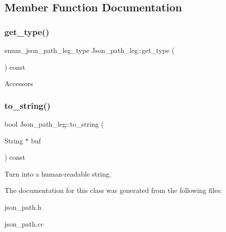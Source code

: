 \subsection{Member Function Documentation}
\mbox{\label{classJson__path__leg_ac4bdd7d72774340b7033a907cab8559c}} 
\subsubsection{\texorpdfstring{get\+\_\+type()}{get\_type()}}
{\footnotesize\ttfamily enum\+\_\+json\+\_\+path\+\_\+leg\+\_\+type Json\+\_\+path\+\_\+leg\+::get\+\_\+type (\begin{DoxyParamCaption}{ }\end{DoxyParamCaption}) const}

Accessors \mbox{\label{classJson__path__leg_ad9bf500a1518502e2f536782ce543ef4}} 
\subsubsection{\texorpdfstring{to\+\_\+string()}{to\_string()}}
{\footnotesize\ttfamily bool Json\+\_\+path\+\_\+leg\+::to\+\_\+string (\begin{DoxyParamCaption}\item[{String $\ast$}]{buf }\end{DoxyParamCaption}) const}

Turn into a human-\/readable string. 

The documentation for this class was generated from the following files\+:\begin{DoxyCompactItemize}
\item 
json\+\_\+path.\+h\item 
json\+\_\+path.\+cc\end{DoxyCompactItemize}
